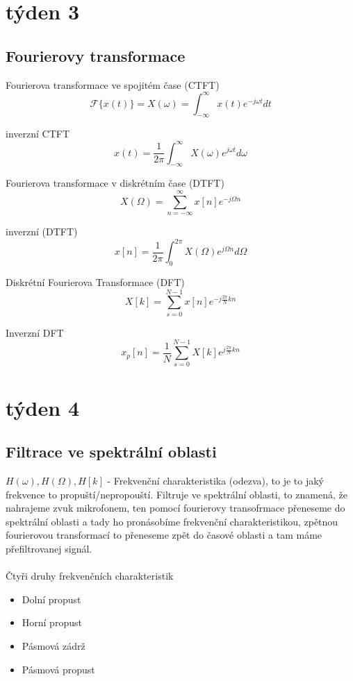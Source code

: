 \documentclass{article}
\begin{document}
\section*{týden 3}
	\subsection*{Fourierovy transformace}
		Fourierova transformace ve spojitém čase (CTFT)
			\[\mathcal{F}\{x(t)\} = X(\omega) 
			= \int_{-\infty}^{\infty} x(t)e^{-j\omega t} dt\]

		inverzní CTFT 
			\[x(t) = \frac{1}{2\pi} 
			\int_{-\infty}^{\infty} X(\omega)e^{j\omega t}d\omega\]

		Fourierova transformace v diskrétním čase (DTFT) 
		\[X(\Omega) = \sum_{n = - \infty}^{\infty} x[n]e^{-j\Omega n}\]

		inverzní (DTFT) 
		\[x[n] = \frac{1}{2 \pi} \int_{0}^{2 \pi} X(\Omega ) e^{j \Omega n} d\Omega\]


		Diskrétní Fourierova Transformace (DFT)
		\[X[k] = \sum_{s=0}^{N-1} x[n] e^{-j \frac{2\pi}{N}kn}\]

		Inverzní DFT
		\[x_p[n] = \frac{1}{N} \sum_{s=0}^{N-1} X[k] e^{j \frac{2\pi}{N}kn}\]


\section*{týden 4}
	\subsection*{Filtrace ve spektrální oblasti}
		$H(\omega), H(\Omega), H[k]$ - Frekvenční charakteristika (odezva), to je to jaký frekvence to propuští/nepropouští.
		Filtruje ve spektrální oblasti, to znamená, že nahrajeme zvuk mikrofonem,
		ten pomocí fourierovy transofrmace přeneseme do spektrální oblasti a 
		tady ho pronásobíme frekvenční charakteristikou, zpětnou fourierovou transformací
		to přeneseme zpět do časové oblasti a tam máme přefiltrovanej signál.\\\\
		Čtyři druhy frekvenčních charakteristik
		\begin{itemize}
			\item Dolní propust
			\item Horní propust
			\item Pásmová zádrž
			\item Pásmová propust
		\end{itemize}
\end{document}
